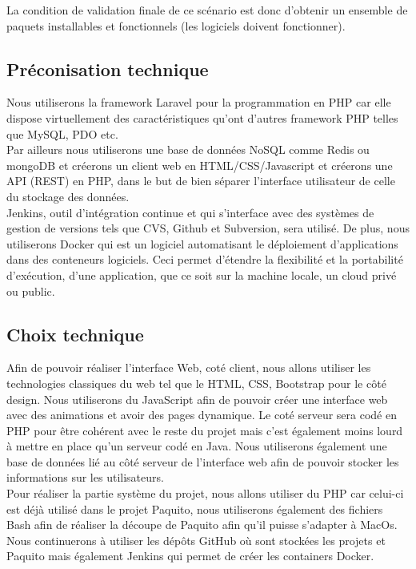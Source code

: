 \documentclass[12pt,a4paper]{article}
\begin{document}
	La condition de validation finale de ce scénario est donc d'obtenir un ensemble de paquets installables et fonctionnels (les logiciels doivent fonctionner).

	\subsection{Préconisation technique}
	Nous utiliserons la framework Laravel pour la programmation en PHP car elle dispose
virtuellement des caractéristiques qu'ont d'autres framework PHP telles que MySQL,
PDO etc.\\
Par ailleurs nous utiliserons une base de données NoSQL comme Redis ou mongoDB
et créerons un client web en HTML/CSS/Javascript et créerons une API (REST) en
PHP, dans le but de bien séparer l'interface utilisateur de celle du stockage des
données.\\
Jenkins, outil d'intégration continue et qui s'interface avec des systèmes de gestion de versions tels que CVS, Github et Subversion, sera utilisé. De plus, nous utiliserons
Docker qui est un logiciel automatisant le déploiement d'applications dans des
conteneurs logiciels. Ceci permet d'étendre la flexibilité et la portabilité d'exécution, d'une application, que ce soit sur la machine locale, un cloud privé ou public.
	\subsection{Choix technique}
	Afin de pouvoir réaliser l'interface Web, coté client, nous allons utiliser les technologies \og classiques \fg{} du web tel que le HTML, CSS, Bootstrap pour le côté design. Nous utiliserons du JavaScript afin de pouvoir créer une interface web avec des animations et avoir des pages dynamique. Le coté serveur sera codé en PHP pour être cohérent avec le reste du projet mais c'est également moins lourd à mettre en place qu'un serveur codé en Java. Nous utiliserons également une base de données lié au côté serveur de l'interface web afin de pouvoir stocker les informations sur les utilisateurs.\\
Pour réaliser la partie système du projet, nous allons utiliser du PHP car celui-ci est déjà utilisé dans le projet Paquito, nous utiliserons également des fichiers Bash afin de réaliser la découpe de Paquito afin qu'il puisse s'adapter à MacOs. Nous continuerons à utiliser les dépôts GitHub où sont stockées les projets et Paquito mais également Jenkins qui permet de créer les containers Docker.
		
\end{document}
